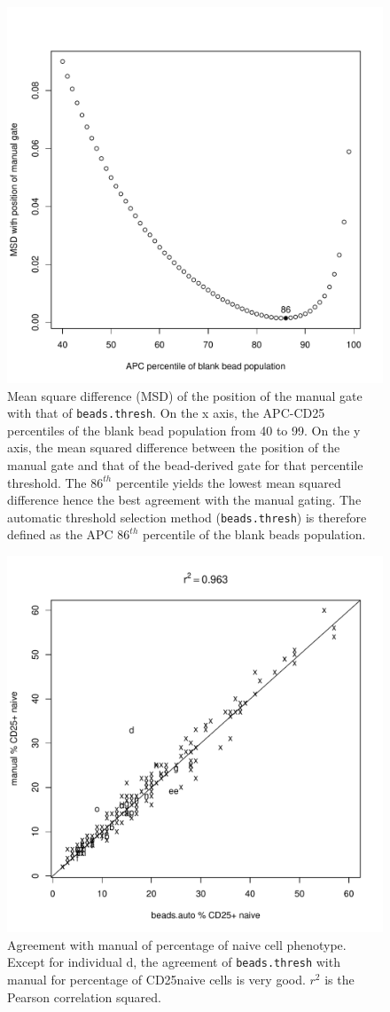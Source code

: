 \begin{figure}[h]
\centering
  \includegraphics[width=.5\textwidth]{figures/cd25pos-gate-agreement.pdf}
{ Mean square difference (MSD) of the position of the manual gate with that of \texttt{beads.thresh}. }
{
On the x axis, the APC-CD25 percentiles of the blank bead population from 40 to 99.
On the y axis, the mean squared difference between the position of the manual gate and that of the bead-derived gate for that percentile threshold.
The $86^{th}$ percentile yields the lowest mean squared difference hence the best agreement with the manual gating.
The automatic threshold selection method (\texttt{beads.thresh}) is therefore defined as the APC $86^{th}$ percentile of the blank beads population.
}
\end{figure}

\begin{figure}[h]
\centering
\includegraphics[width=.6\textwidth]{figures/naive-cd25pos-beads-manual-agreement.pdf}
{ Agreement with manual of percentage of \positive naive cell phenotype. }
{
  Except for individual d, the agreement of \texttt{beads.thresh} with manual for percentage of CD25\positive naive cells
  is very good.  $r^2$ is the Pearson correlation squared.
}
\end{figure}


